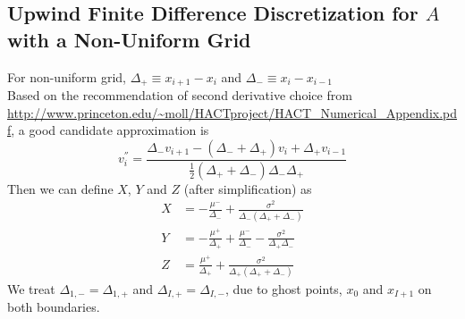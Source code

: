 \documentclass[11pt]{etk-article}
\begin{document}
\subsection{Upwind Finite Difference Discretization for $A$ with a Non-Uniform Grid}
For non-uniform grid, $\Delta_{+} \equiv x_{i+1} - x_{i}$ and $\Delta_{-} \equiv x_{i} - x_{i-1}$\\
Based on the recommendation of second derivative choice from \url{http://www.princeton.edu/~moll/HACTproject/HACT_Numerical_Appendix.pdf}, a good candidate approximation is
\begin{equation}
v_i^{''} = \frac{\Delta_{-}v_{i+1} - (\Delta_{-}+\Delta_{+})v_i+\Delta_{+}v_{i-1}}{\frac{1}{2}(\Delta_{+}+\Delta_{-})\Delta_{-}\Delta_{+}} \label{eq:v''}
\end{equation}
Then we can define $X$, $Y$ and $Z$ (after simplification) as 
\begin{align}
X%
&= -\frac{\mu^{-}}{\Delta_{-}} +\frac{\sigma^{2}}{\Delta_{-}(\Delta_{+}+\Delta_{-})}\label{eq:X-non-uniform}\\
Y &= -\frac{\mu^{+}}{\Delta_{+}}+\frac{\mu^{-}}{\Delta_{-}} -\frac{\sigma^2}{\Delta_{+}\Delta_{-}}\label{eq:Y-non-uniform}\\
Z %
&= \frac{\mu^{+}}{\Delta_{+}} + \frac{\sigma^{2}}{\Delta_{+}(\Delta_{+}+\Delta_{-})}\label{eq:Z-non-uniform}
\end{align}
We treat $\Delta_{1, -} = \Delta_{1, +}$ and $\Delta_{I, +} = \Delta_{I, -}$, due to ghost points, $x_0$ and $x_{I+1}$ on both boundaries.  \\
\end{document}
